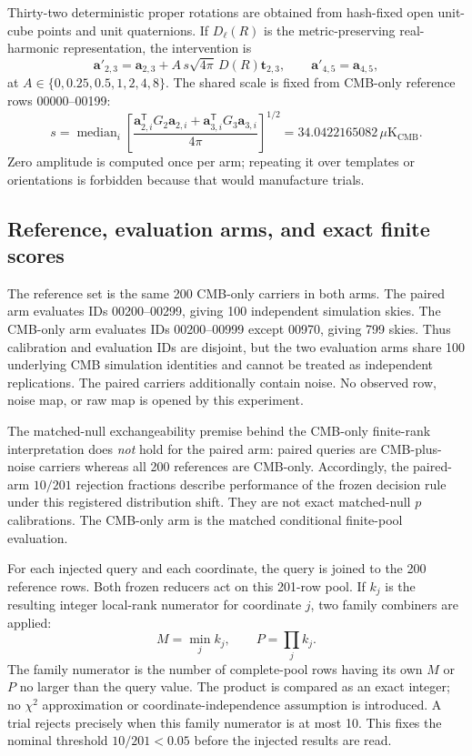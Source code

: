 \documentclass[11pt,a4paper]{article}
\newcommand{\microK}{\mu\mathrm{K}_{\mathrm{CMB}}}
\begin{document}
Thirty-two deterministic proper rotations are obtained from hash-fixed open
unit-cube points and unit quaternions.  If $D_\ell(R)$ is the metric-preserving
real-harmonic representation, the intervention is
\begin{equation}
 \boldsymbol a'_{2,3}=\boldsymbol a_{2,3}
   +A\,s\sqrt{4\pi}\,D(R)\boldsymbol t_{2,3},
 \qquad
 \boldsymbol a'_{4,5}=\boldsymbol a_{4,5},
 \label{eq:carrier-injection}
\end{equation}
at $A\in\{0,0.25,0.5,1,2,4,8\}$.  The shared scale is fixed from CMB-only
reference rows 00000--00199:
\[
 s=\operatorname{median}_i
 \left[\frac{\boldsymbol a_{2,i}^{\mathsf T}G_2\boldsymbol a_{2,i}+
 \boldsymbol a_{3,i}^{\mathsf T}G_3\boldsymbol a_{3,i}}{4\pi}\right]^{1/2}
 =34.0422165082\,\microK.
\]
Zero amplitude is computed once per arm; repeating it over templates or
orientations is forbidden because that would manufacture trials.

\subsection{Reference, evaluation arms, and exact finite scores}

The reference set is the same 200 CMB-only carriers in both arms.  The paired
arm evaluates IDs 00200--00299, giving 100 independent simulation skies.  The
CMB-only arm evaluates IDs 00200--00999 except 00970, giving 799 skies.  Thus
calibration and evaluation IDs are disjoint, but the two evaluation arms share
100 underlying CMB simulation identities and cannot be treated as independent
replications.  The paired carriers additionally contain noise.  No observed
row, noise map, or raw map is opened by this experiment.

The matched-null exchangeability premise behind the CMB-only finite-rank
interpretation does \emph{not} hold for the paired arm: paired queries are
CMB-plus-noise carriers whereas all 200 references are CMB-only.  Accordingly,
the paired-arm $10/201$ rejection fractions describe performance of the frozen
decision rule under this registered distribution shift.  They are not exact
matched-null $p$ calibrations.  The CMB-only arm is the matched conditional
finite-pool evaluation.

For each injected query and each coordinate, the query is joined to the 200
reference rows.  Both frozen reducers act on this 201-row pool.  If $k_j$ is
the resulting integer local-rank numerator for coordinate $j$, two family
combiners are applied:
\[
  M=\min_j k_j,
  \qquad
  P=\prod_j k_j.
\]
The family numerator is the number of complete-pool rows having its own $M$ or
$P$ no larger than the query value.  The product is compared as an exact
integer; no $\chi^2$ approximation or coordinate-independence assumption is
introduced.  A trial rejects precisely when this family numerator is at most
10.  This fixes the nominal threshold $10/201<0.05$ before the injected
results are read.
\end{document}
